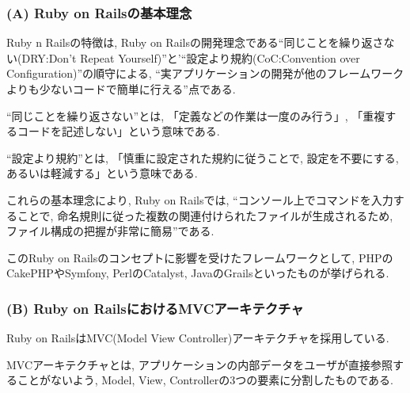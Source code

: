 \subsubsection{(A) Ruby on Railsの基本理念}
Ruby n Railsの特徴は, Ruby on Railsの開発理念である“同じことを繰り返さない(DRY:Don't Repeat Yourself)”と'“設定より規約(CoC:Convention over Configuration)”の順守による, “実アプリケーションの開発が他のフレームワークよりも少ないコードで簡単に行える”点である.

“同じことを繰り返さない”とは, 「定義などの作業は一度のみ行う」, 「重複するコードを記述しない」という意味である.

“設定より規約”とは, 「慎重に設定された規約に従うことで, 設定を不要にする, あるいは軽減する」という意味である.

これらの基本理念により, Ruby on Railsでは, “コンソール上でコマンドを入力することで, 命名規則に従った複数の関連付けられたファイルが生成されるため, ファイル構成の把握が非常に簡易”である.

このRuby on Railsのコンセプトに影響を受けたフレームワークとして, PHPのCakePHPやSymfony, PerlのCatalyst, JavaのGrailsといったものが挙げられる.

\subsubsection{(B) Ruby on RailsにおけるMVCアーキテクチャ}
Ruby on RailsはMVC(Model View Controller)アーキテクチャを採用している.

MVCアーキテクチャとは, アプリケーションの内部データをユーザが直接参照することがないよう, Model, View, Controllerの3つの要素に分割したものである.

